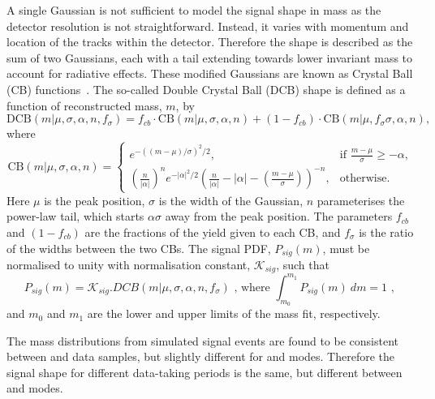 A single Gaussian is not sufficient to model the signal shape in \Bm mass as the detector resolution is not straightforward. Instead, it varies with momentum and location of the tracks within the detector. Therefore the shape is described as the sum of two Gaussians, each with a tail extending towards lower invariant mass to account for radiative effects. These modified Gaussians are known as Crystal Ball (CB) functions~\cite{Skwarnicki:1986xj}. The so-called Double Crystal Ball (DCB) shape is defined as a function of reconstructed mass, $m$, by
\begin{equation}
\mathrm{DCB}(m| \mu,\sigma,\alpha,n,f_{\sigma}) = f_{cb} \cdot \mathrm{CB}(m| \mu,\sigma,\alpha,n) + (1-f_{cb}) \cdot \mathrm{CB}(m|\mu,f_{\sigma}\sigma,\alpha,n),
\label{DCBshape}
\end{equation}
where
\begin{equation*}
  \mathrm{CB}(m| \mu,\sigma,\alpha,n)=
\begin{cases}
    e^{-((m-\mu)/ \sigma)^2/2},                                   & \text{if } \frac{m-\mu}{\sigma} \geq - \alpha, \\
   \left ( \frac{n}{|\alpha|} \right ) ^n e^{-|\alpha|^2/2} \left ( \frac{n}{|\alpha|} - |\alpha| - \left ( \frac{m-\mu}{\sigma} \right ) \right ) ^{-n} ,    & \text{otherwise.}
\end{cases}
\end{equation*}
Here $\mu$ is the peak position, $\sigma$ is the width of the Gaussian, $n$ parameterises the power-law tail, which starts $\alpha\sigma$ away from the peak position. The parameters $f_{cb}$ and $(1-f_{cb})$ are the fractions of the yield given to each CB, and $f_{\sigma}$ is the ratio of the widths between the two CBs. The signal PDF, $P_{sig}(m)$, must be normalised to unity with normalisation constant, $\mathcal{K}_{sig}$, such that
\begin{equation}
P_{sig}(m) = \mathcal{K}_{sig} . DCB(m| \mu,\sigma,\alpha,n,f_{\sigma}) \text{ ,	where } \int_{m_0}^{m_1} P_{sig}(m)\ dm = 1 \text{ , }
\end{equation}
and $m_0$ and $m_1$ are the lower and upper limits of the mass fit, respectively.

The \Bm mass distributions from simulated signal events are found to be consistent between \runone and \runtwo data samples, but slightly different for \kpi and \kpipipi modes. Therefore the signal shape for different data-taking periods is the same, but different between \kpi and \kpipipi modes. 

